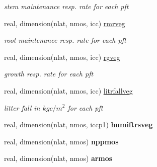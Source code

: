 \begin{DoxyCompactItemize}
\begin{DoxyCompactList}\small\item\em stem maintenance resp. rate for each pft \end{DoxyCompactList}\item 
\hypertarget{structctem__statevars_1_1veg__rot_af9034ec5872237f7add2d43f73def6b0}{}real, dimension(nlat, nmos, icc) \hyperlink{structctem__statevars_1_1veg__rot_af9034ec5872237f7add2d43f73def6b0}{rmrveg}\label{structctem__statevars_1_1veg__rot_af9034ec5872237f7add2d43f73def6b0}

\begin{DoxyCompactList}\small\item\em root maintenance resp. rate for each pft \end{DoxyCompactList}\item 
\hypertarget{structctem__statevars_1_1veg__rot_a319f22002f4e63fd2f07b0f91c917d4c}{}real, dimension(nlat, nmos, icc) \hyperlink{structctem__statevars_1_1veg__rot_a319f22002f4e63fd2f07b0f91c917d4c}{rgveg}\label{structctem__statevars_1_1veg__rot_a319f22002f4e63fd2f07b0f91c917d4c}

\begin{DoxyCompactList}\small\item\em growth resp. rate for each pft \end{DoxyCompactList}\item 
\hypertarget{structctem__statevars_1_1veg__rot_ae1f56a16e598b4e5403ef8e36fc545c9}{}real, dimension(nlat, nmos, icc) \hyperlink{structctem__statevars_1_1veg__rot_ae1f56a16e598b4e5403ef8e36fc545c9}{litrfallveg}\label{structctem__statevars_1_1veg__rot_ae1f56a16e598b4e5403ef8e36fc545c9}

\begin{DoxyCompactList}\small\item\em litter fall in $kg c/m^2$ for each pft \end{DoxyCompactList}\item 
\hypertarget{structctem__statevars_1_1veg__rot_ae8f41446d6babb17b839cbce5bc57051}{}real, dimension(nlat, nmos, iccp1) {\bfseries humiftrsveg}\label{structctem__statevars_1_1veg__rot_ae8f41446d6babb17b839cbce5bc57051}

\item 
\hypertarget{structctem__statevars_1_1veg__rot_ae1053300295ccd6ad587990639fc5b60}{}real, dimension(nlat, nmos) {\bfseries nppmos}\label{structctem__statevars_1_1veg__rot_ae1053300295ccd6ad587990639fc5b60}

\item 
\hypertarget{structctem__statevars_1_1veg__rot_a32d4f4563d32eac7d218f620baed13b5}{}real, dimension(nlat, nmos) {\bfseries armos}\label{structctem__statevars_1_1veg__rot_a32d4f4563d32eac7d218f620baed13b5}


\end{DoxyCompactItemize}
